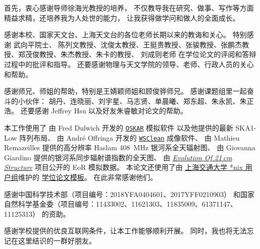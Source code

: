 
\begin{thanks}

首先，衷心感谢导师徐海光教授的培养，
不仅教导我在研究、做事、写作等方面精益求精，还培养我为人处世的能力，
让我获得做学问和做人的全面成长。

感谢本校、国家天文台、上海天文台的各位老师长期以来的教诲和关心。
特别感谢
武向平院士、
陈列文教授、沈俊太教授、王挺贵教授、张骏教授、张鹏杰教授、郑茂俊教授、朱杰教授、朱卡的教授、
刘成则老师
在学位论文的评阅和答辩过程中的批评和指导。
还要感谢物理与天文学院的领导、老师、行政人员的关心和帮助。

感谢师兄、师姐的帮助，特别是王婧颖师姐和顾俊骅师兄。
感谢课题组里一起奋斗的小伙伴：
胡丹、连晓丽、刘宇星、马志贤、单晨曦、郑东超、朱永凯、朱正浩。
还要感谢 Jeffrey Hsu 以及好友朱睿敏对论文的帮助。

本工作使用了
由 Fred Dulwich 开发的
\href{https://github.com/OxfordSKA/OSKAR}{\texttt{OSKAR}} 模拟软件
以及他提供的最新 SKA1-Low 阵列布局、
由 André Offringa 开发的
\href{https://sourceforge.net/projects/wsclean/}{\texttt{WSClean}} 成像软件、
由 Mathieu Remazeilles 提供的高分辨率 Haslam \SI{408}{\MHz} 银河系全天辐射图、
由 Giovanna Giardino 提供的银河系同步辐射谱指数的全天图、
由 \href{http://homepage.sns.it/mesinger/EOS.html}{%
  \textit{Evolution Of 21\,cm Structure}} 项目公开的 EoR 模拟数据。
本论文还使用了由%
\href{http://sjtug.org/}{上海交通大学 *nix 用户组}维护的
\href{https://github.com/sjtug/SJTUThesis}{\XeLaTeX{} 学位论文模板}。
在此非常感谢他们。

感谢中国科学技术部（项目编号：2018YFA0404601、2017YFF0210903）
和国家自然科学基金委（项目编号：11433002、11621303、11835009、61371147、11125313）
的资助。

感谢学校提供的优良互联网条件，让本工作能够顺利开展。
同时，我也将无法忘记在这里结识的一群好朋友。


\end{thanks}
